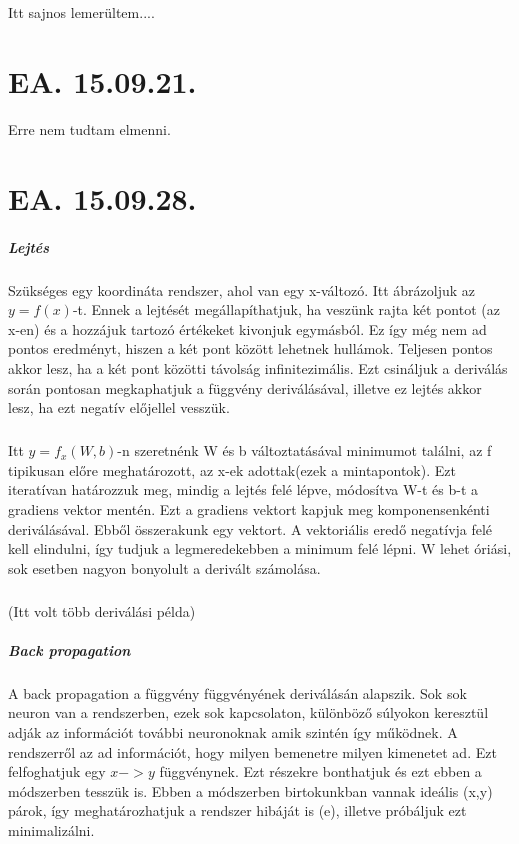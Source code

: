 \documentclass[10pt,a4paper]{report}
\begin{document}
\paragraph{}
Itt sajnos lemerültem....
\chapter{EA. 15.09.21.}
Erre nem tudtam elmenni.
\chapter{EA. 15.09.28.}
\paragraph{Lejtés}
Szükséges egy koordináta rendszer, ahol van egy x-változó. Itt ábrázoljuk az $y = f(x)$-t. Ennek a lejtését megállapíthatjuk, ha veszünk rajta két pontot (az x-en) és a hozzájuk tartozó értékeket kivonjuk egymásból. Ez így még nem ad pontos eredményt, hiszen a két pont között lehetnek hullámok. Teljesen pontos akkor lesz, ha a két pont közötti távolság infinitezimális. Ezt csináljuk a deriválás során pontosan megkaphatjuk a függvény deriválásával, illetve ez lejtés akkor lesz, ha ezt negatív előjellel vesszük.
\paragraph{}
Itt $y = f_x(W,b)$-n szeretnénk W és b változtatásával minimumot találni, az f tipikusan előre meghatározott, az x-ek adottak(ezek a mintapontok). Ezt iteratívan határozzuk meg, mindig a lejtés felé lépve, módosítva W-t és b-t a gradiens vektor mentén. Ezt a gradiens vektort kapjuk meg komponensenkénti deriválásával. Ebből összerakunk egy vektort. A vektoriális eredő negatívja felé kell elindulni, így tudjuk a legmeredekebben a minimum felé lépni. W lehet óriási, sok esetben nagyon bonyolult a derivált számolása.
\paragraph{}
(Itt volt több deriválási példa)
\paragraph{Back propagation}
A back propagation a függvény függvényének deriválásán alapszik. Sok sok neuron van a rendszerben, ezek sok kapcsolaton, különböző súlyokon keresztül adják az információt további neuronoknak amik szintén így működnek. A rendszerről az ad információt, hogy milyen bemenetre milyen kimenetet ad. Ezt felfoghatjuk egy $x -> y$ függvénynek. Ezt részekre bonthatjuk és ezt ebben a módszerben tesszük is. Ebben a módszerben birtokunkban vannak ideális (x,y) párok, így meghatározhatjuk a rendszer hibáját is (e), illetve próbáljuk ezt minimalizálni.
\end{document}
